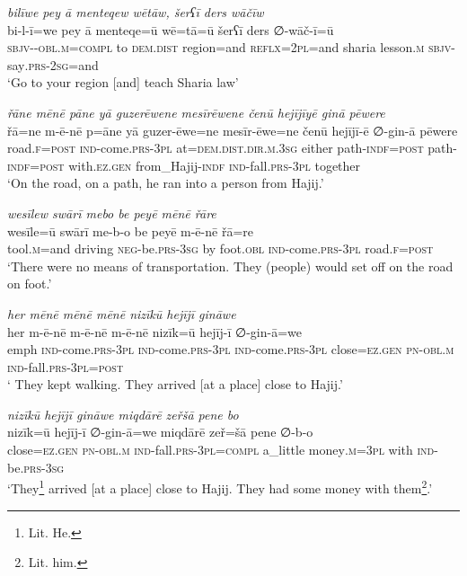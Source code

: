 \ea \label{ŽP.93}
\textit{bilīwe pey ā menteqew wētāw, šerʕī ders wāčīw} \\ 
\gll bi-l-ī=we pey ā menteqe=ū wē=tā=ū šerʕī ders ∅-wāč-ī=ū \\ 
 \textsc{sbjv-}\textsc{-obl}\textsc{.m}\textsc{=compl} to \textsc{dem.dist} region=and \textsc{reflx}=\textsc{2pl}=and sharia lesson\textsc{.m} \textsc{sbjv-}say\textsc{.prs-}\textsc{2sg}=and \\ 
\glt `Go to your region [and] teach Sharia law'
\z 
 
\ea \label{ŽP.97}
\textit{řāne mēnē pāne yā guzerēwene mesīrēwene čenū hejījīyē ginā pēwere} \\ 
\gll řā=ne m-ē-nē p=āne yā guzer-ēwe=ne mesīr-ēwe=ne čenū hejījī-ē ∅-gin-ā pēwere \\ 
 road\textsc{.f}\textsc{=\textsc{post}} \textsc{ind-}come\textsc{.prs}\textsc{-3pl} at=\textsc{dem.dist}\textsc{.dir}\textsc{.m}\textsc{.3sg} either path\textsc{-indf}\textsc{=\textsc{post}} path\textsc{-indf}\textsc{=\textsc{post}} with\textsc{.ez.gen} from\_Hajij\textsc{-indf} \textsc{ind-}fall\textsc{.prs}\textsc{-3pl} together \\ 
\glt `On the road, on a path, he ran into a person from Hajij.'
\z 
 
\ea \label{ŽP.99}
\textit{wesīlew swārī mebo be peyē mēnē řāre} \\ 
\gll wesīle=ū swārī me-b-o be peyē m-ē-nē řā=re \\ 
 tool\textsc{.m}=and driving \textsc{neg-}be\textsc{.prs}\textsc{-3sg} by foot\textsc{.obl} \textsc{ind-}come\textsc{.prs}\textsc{-3pl} road\textsc{.f}\textsc{=\textsc{post}} \\ 
\glt `There were no means of transportation. They (people) would set off on the road on foot.'
\z 
 
\ea \label{ŽP.100}
\textit{her mēnē mēnē mēnē nizīkū hejījī gināwe} \\ 
\gll her m-ē-nē m-ē-nē m-ē-nē nizīk=ū hejīj-ī ∅-gin-ā=we \\ 
 emph \textsc{ind-}come\textsc{.prs}\textsc{-3pl} \textsc{ind-}come\textsc{.prs}\textsc{-3pl} \textsc{ind-}come\textsc{.prs}\textsc{-3pl} close\textsc{\textsc{=ez.gen}} \textsc{pn}\textsc{-obl}\textsc{.m} \textsc{ind-}fall\textsc{.prs}\textsc{-3pl}\textsc{=\textsc{post}} \\ 
\glt ` They kept walking. They arrived [at a place] close to Hajij.'
\z 
 
\ea \label{ŽP.101}
\textit{nizīkū hejījī gināwe miqdārē zeřšā pene bo} \\ 
\gll nizīk=ū hejīj-ī ∅-gin-ā=we miqdārē zeř=šā pene ∅-b-o \\ 
 close\textsc{\textsc{=ez.gen}} \textsc{pn}\textsc{-obl}\textsc{.m} \textsc{ind-}fall\textsc{.prs}\textsc{-3pl}\textsc{=compl} a\_little money\textsc{.m}\textsc{=3pl} with \textsc{ind-}be\textsc{.prs}\textsc{-3sg} \\ 
\glt `They\footnote{Lit. He.} arrived [at a place] close to Hajij. They had some money with them\footnote{Lit. him.}.'
\z 
 
